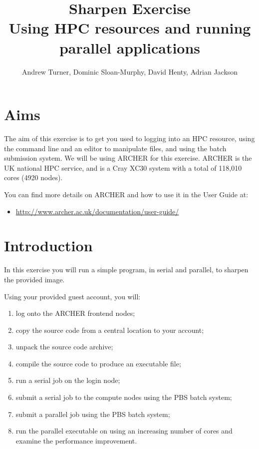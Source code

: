 \documentclass{article}
\title{Sharpen Exercise\\Using HPC resources and running parallel applications}
\author{Andrew Turner, Dominic Sloan-Murphy, David Henty, Adrian Jackson}
\begin{document}
\makeEPCCtitle

\setcounter{tocdepth}{3}
\tableofcontents

\section{Aims}
\label{sec-1}


The aim of this exercise is to get you used to logging into an HPC
resource, using the command line and an editor to manipulate files,
and using the batch submission system.
We will be using ARCHER for this exercise.  ARCHER is the UK national
HPC service, and is a Cray XC30 system with a total of 118,010 cores
(4920 nodes).

You can find more details on ARCHER and how to use it in the User
Guide at:

\begin{itemize}
\item \href{http://www.archer.ac.uk/documentation/user-guide/}{http://www.archer.ac.uk/documentation/user-guide/}
\end{itemize}
\section{Introduction}
\label{sec-2}


In this exercise you will run a simple program, in serial and
parallel, to sharpen the provided image.

Using your provided guest account, you will:

\begin{enumerate}
\item log onto the ARCHER frontend nodes;
\item copy the source code from a central location to your account;
\item unpack the source code archive;
\item compile the source code to produce an executable file;
\item run a serial job on the login node;
\item submit a serial job to the compute nodes using the PBS batch system;
\item submit a parallel job using the PBS batch system;
\item run the parallel executable on using an
   increasing number of cores and examine the performance improvement.
   
\end{enumerate}
\end{document}
